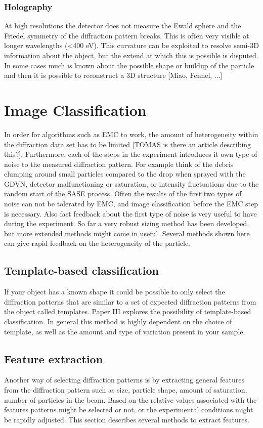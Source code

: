 \subsection{Holography}
At high resolutions the detector does not measure the Ewald sphere and the Friedel symmetry of the diffraction pattern breaks. This is often very visible at longer wavelengths (<400 eV). This curvature can be exploited to resolve semi-3D information about the object, but the extend at which this is possible is disputed. In some cases much is known about the possible shape or buildup of the particle and then it is possible to reconstruct a 3D structure [Miao, Fennel, ...]

\chapter{Image Classification}
In order for algorithms such as EMC to work, the amount of heterogeneity within the diffraction data set has to be limited [TOMAS is there an article describing this?]. Furthermore, each of the steps in the experiment introduces it own type of noise to the measured diffraction pattern. For example think of the debris clumping around small particles compared to the drop when sprayed with the GDVN, detector malfunctioning or saturation, or intensity fluctuations due to the random start of the SASE process. Often the results of the first two types of noise can not be tolerated by EMC, and image classification before the EMC step is necessary. Also fast feedback about the first type of noise is very useful to have during the experiment. So far a very robust sizing method has been developed, but more extended methods might come in useful. Several methods shown here can give rapid feedback on the heterogeneity of the particle.

\section{Template-based classification}
If your object has a known shape it could be possible to only select the diffraction patterns that are similar to a set of expected diffraction patterns from the object called templates. Paper III explores the possibility of template-based classification. In general this method is highly dependent on the choice of template, as well as the amount and type of variation present in your sample.

\section{Feature extraction}
Another way of selecting diffraction patterns is by extracting general features from the diffraction pattern such as size, particle shape, amount of saturation, number of particles in the beam. Based on the relative values associated with the features patterns might be selected or not, or the experimental conditions might be rapidly adjusted. This section describes several methods to extract features.

